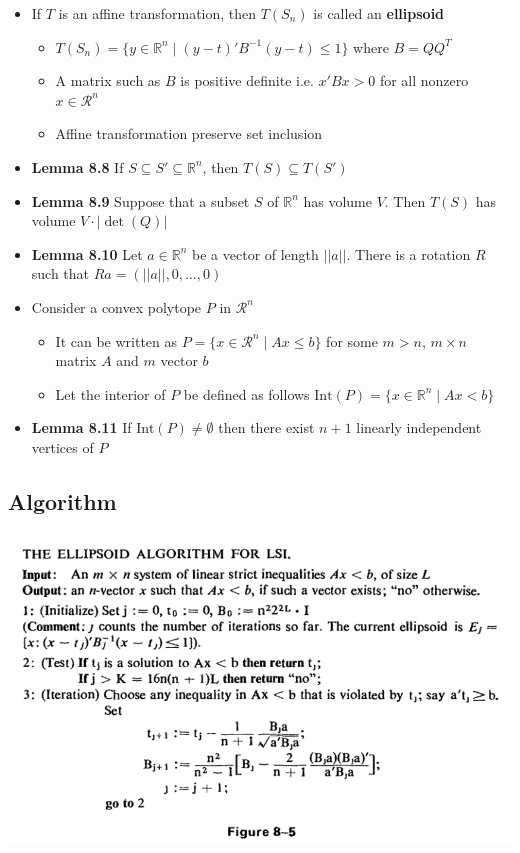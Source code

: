\documentclass[11pt]{article}
\begin{document}
\begin{itemize}
\item If \(T\) is an affine transformation, then \(T(S_n)\) is called an \textbf{ellipsoid}
\begin{itemize}
\item \(T(S_n) = \{y \in \mathbb R^n \mid (y-t)' B^{-1} (y-t) \leq 1\}\) where \(B = QQ^T\)
\item A matrix such as \(B\) is positive definite i.e. \(x'Bx > 0\) for all nonzero \(x \in \mathcal R^n\)
\item Affine transformation preserve set inclusion
\end{itemize}

\item \textbf{Lemma 8.8} If \(S \subseteq S' \subseteq \mathbb R^n\), then \(T(S) \subseteq T(S')\)

\item \textbf{Lemma 8.9} Suppose that a subset \(S\) of \(\mathbb R^n\) has volume \(V\). Then \(T(S)\) has volume \(V \cdot | \det(Q)|\)

\item \textbf{Lemma 8.10} Let \(a \in \mathbb R^n\) be a vector of length \(||a||\). There is a rotation \(R\) such that \(Ra = (||a||,0, \dots, 0)\)

\item Consider a convex polytope \(P\) in \(\mathcal R^n\)
\begin{itemize}
\item It can be written as \(P=\{x \in \mathcal R^n \mid Ax \leq b\}\) for some \(m > n\), \(m \times n\) matrix \(A\) and \(m\) vector \(b\)
\item Let the interior of \(P\) be defined as follows \(\text{Int}(P) = \{x \in \mathbb R^n \mid Ax < b\}\)
\end{itemize}
\item \textbf{Lemma 8.11} If \(\text{Int}(P) \neq \emptyset\) then there exist \(n+1\) linearly independent vertices of \(P\)
\end{itemize}

\subsection{Algorithm}
\label{sec:orgfc46869}
\begin{center}
\includegraphics[width=.9\linewidth]{The Ellipsoid Algorithm/screenshot_2019-03-10_13-04-15.png}
\end{center} 
\end{document}

